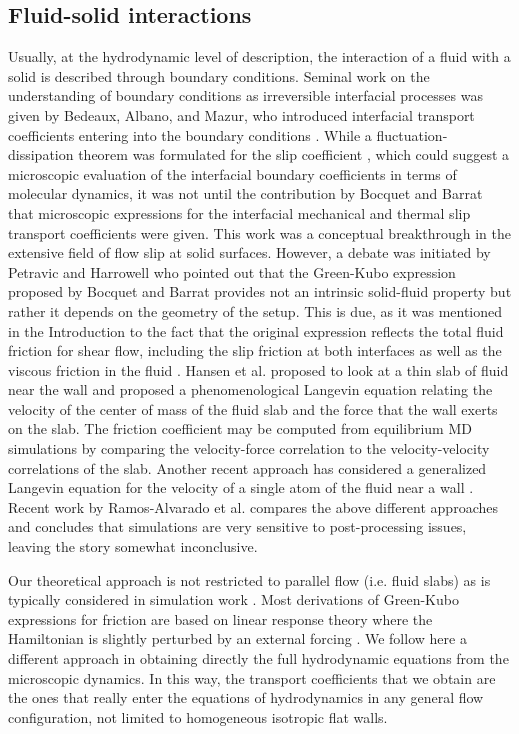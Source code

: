 \documentclass[b5paper,openright,10pt]{book}
\begin{document}
\subsection{Fluid-solid  interactions}
Usually, at the hydrodynamic level  of description, the interaction of
a fluid with a solid is described through boundary conditions. Seminal
work  on  the understanding  of  boundary  conditions as  irreversible
interfacial processes  was given  by Bedeaux,  Albano, and  Mazur, who
introduced  interfacial  transport   coefficients  entering  into  the
boundary       conditions      \cite{Bedeaux1976}.        While      a
fluctuation-dissipation   theorem   was   formulated  for   the   slip
coefficient  \cite{Bedeaux1977},  which  could suggest  a  microscopic
evaluation  of  the  interfacial  boundary coefficients  in  terms  of
molecular dynamics, it  was not until the contribution  by Bocquet and
Barrat  that microscopic  expressions for  the interfacial  mechanical
\cite{Bocquet1994}  and   thermal  \cite{Barrat2003}   slip  transport
coefficients were given.   This work was a  conceptual breakthrough in
the extensive field of flow slip at solid surfaces.  However, a debate
was  initiated  by  Petravic  and  Harrowell  \cite{Petravic2007}  who
pointed out  that the  Green-Kubo expression  proposed by  Bocquet and
Barrat provides  not an intrinsic  solid-fluid property but  rather it
depends on the geometry of the setup. 
This is due, as it was mentioned in the Introduction to the fact that the
original expression reflects the total  fluid friction for shear flow,
including the slip friction at both  interfaces as well as the viscous
friction  in   the  fluid  \cite{Hansen2011,Kannam2011}. 
Hansen  et
al. \cite{Hansen2011} proposed to look at a thin slab of fluid near the
wall  and proposed  a phenomenological  Langevin equation  relating the
velocity of the  center of mass of  the fluid slab and  the force that
the wall exerts on the slab. The friction coefficient may be computed
from  equilibrium  MD  simulations  by  comparing  the  velocity-force
correlation to the velocity-velocity correlations of the slab. Another
recent approach has considered a generalized Langevin equation for the
velocity of a  single atom of the fluid near  a wall \cite{Huang2014}.
Recent  work  by   Ramos-Alvarado  et  al.   \cite{Ramos-Alvarado2016}
compares the above different approaches and concludes that simulations
are  very  sensitive  to  post-processing  issues,  leaving  the  story
somewhat inconclusive.

Our  theoretical approach  is not  restricted to  parallel flow  (i.e.
fluid   slabs)  as   is  typically   considered  in   simulation  work
\cite{Bocquet1994,Petravic2007,Hansen2011,Kannam2011,Ramos-Alvarado2016}.
Most derivations of  Green-Kubo expressions for friction  are based on
linear response theory where the  Hamiltonian is slightly perturbed by
an external  forcing \cite{Bocquet1994,Huang2014}.   We follow  here a
different  approach  in  obtaining   directly  the  full  hydrodynamic
equations from the  microscopic dynamics.  In this  way, the transport
coefficients  that  we obtain  are  the  ones  that really  enter  the
equations  of hydrodynamics  in  any general  flow configuration,  not
limited to homogeneous isotropic flat walls.
\end{document}
